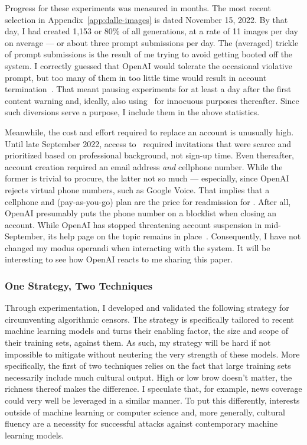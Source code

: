Progress for these experiments was measured in months. The most recent selection
in Appendix~\ref{app:dalle-images} is dated November 15, 2022. By
that day, I had created 1,153 or 80\% of all generations, at a rate of 11 images
per day on average --- or about three prompt submissions per day. The (averaged)
trickle of prompt submissions is the result of me trying to avoid getting booted
off the system. I correctly guessed that OpenAI would tolerate the occasional
violative prompt, but too many of them in too little time would result in
account termination~\cite{SpicyElephant2022}. That meant pausing experiments for
at least a day after the first content warning and, ideally, also using \DALLE\
for innocuous purposes thereafter. Since such diversions serve a purpose, I
include them in the above statistics.

Meanwhile, the cost and effort required to replace an account is unusually high.
Until late September 2022, access to \DALLE\ required invitations that were
scarce and prioritized based on professional background, not sign-up time. Even
thereafter, account creation required an email address \emph{and} cellphone
number. While the former is trivial to procure, the latter not so much ---
especially, since OpenAI rejects virtual phone numbers, such as Google Voice.
That implies that a cellphone and (pay-as-you-go) plan are the price for
readmission for \DALLE. After all, OpenAI presumably puts the phone number on a
blocklist when closing an account. While OpenAI has stopped threatening account
suspension in mid-September, its help page on the topic remains in
place~\cite{Natalie2022}. Consequently, I have not changed my modus operandi
when interacting with the system. It will be interesting to see how OpenAI
reacts to me sharing this paper.


\subsubsection{One Strategy, Two Techniques}

Through experimentation, I developed and validated the following strategy for
circumventing algorithmic censors. The strategy is specifically tailored to
recent machine learning models and turns their enabling factor, the size and
scope of their training sets, against them. As such, my strategy will be hard if
not impossible to mitigate without neutering the very strength of these models.
More specifically, the first of two techniques relies on the fact that large
training sets necessarily include much cultural output. High or low brow doesn't
matter, the richness thereof makes the difference. I speculate that, for
example, news coverage could very well be leveraged in a similar manner. To put
this differently, interests outside of machine learning or computer science and,
more generally, cultural fluency are a necessity for successful attacks against
contemporary machine learning models.

